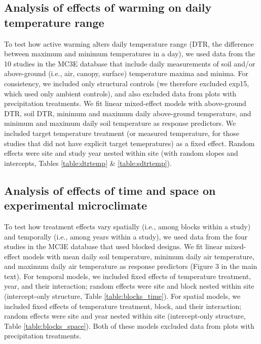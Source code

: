 \documentclass{article}
\begin{document}
\subsection* {Analysis of effects of warming on daily temperature range}
To test how active warming alters daily temperature range (DTR, the difference between maximum and minimum temperatures in a day), we used data from the 10 studies in the MC3E database that include daily measurements of soil and/or above-ground (i.e., air, canopy, surface) temperature maxima and minima. For consistency, we included only structural controls (we therefore excluded exp15, which used only ambient controls), and also excluded data from plots with precipitation treatments. We fit linear mixed-effect models with above-ground DTR, soil DTR, minimum and maximum daily above-ground temperature, and minimum and maximum daily soil temperature as response predictors. We included target temperature treatment (or measured temperature, for those studies that did not have explicit target temepratures) as a fixed effect. Random effects were site and study year nested within site (with random slopes and intercepts, Tables \ref{table:dtrtemp} \& \ref{table:sdtrtemp}). 

\subsection* {Analysis of effects of time and space on experimental microclimate}
To test how treatment effects vary spatially (i.e., among blocks within a study) and temporally (i.e., among years within a study), we used data from the four studies in the MC3E database that used blocked designs. We fit linear mixed-effect models with mean daily soil temperature, minimum daily air temperature, and maximum daily air temperature as response predictors (Figure 3 in the main text). For temporal models, we included fixed effects of temperature treatment, year, and their interaction; random effects were site and block nested within site (intercept-only structure, Table \ref{table:blocks_time}). For spatial models, we included fixed effects of temperature treatment, block, and their interaction; random effects were site and year nested within site (intercept-only structure, Table \ref{table:blocks_space}). Both of these models excluded data from plots with precipitation treatments. 
\end{document}
